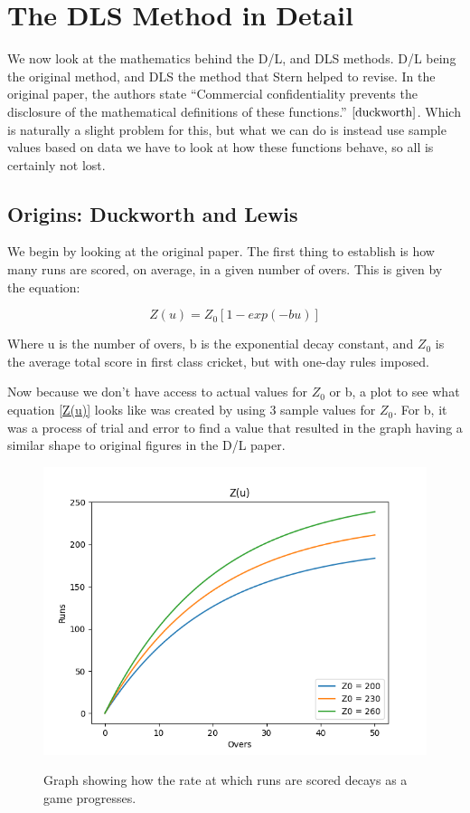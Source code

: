 \chapter{The DLS Method in Detail}

We now look at the mathematics behind the D/L, and DLS methods. D/L being the original
method, and DLS the method that Stern helped to revise. In the original paper, the authors
state ``Commercial confidentiality prevents the disclosure of the mathematical definitions
of these functions.'' $\cite{duckworth}$. Which is naturally a slight problem for this, but what
we can do is instead use sample values based on data we have to look at how these functions behave,
so all is certainly not lost.

\section{Origins: Duckworth and Lewis}
We begin by looking at the original paper. The first thing to establish is how many runs are scored,
on average, in a given number of overs. This is given by the equation:

\begin{equation}
    Z(u) = Z_0[1-exp(-bu)]
    \label{Z(u)}  
\end{equation}

Where u is the number of overs, b is the exponential decay constant, and $Z_0$ is the
average total score in first class cricket, but with one-day rules imposed.  

Now because we don't have access to actual values for $Z_0$ or b, a plot to see what equation \ref{Z(u)} looks 
like was created by using 3 sample values for $Z_0$. For b, it was a process of trial and error to find a value
that resulted in the graph having a similar shape to original figures in the D/L paper. 

\begin{figure}[h]
    \centering
    \includegraphics[scale=0.6]{figures/z(u).png}
    \label{Z(u)_graph}
    \caption{Graph showing how the rate at which runs are scored decays as a game progresses.}
\end{figure}

